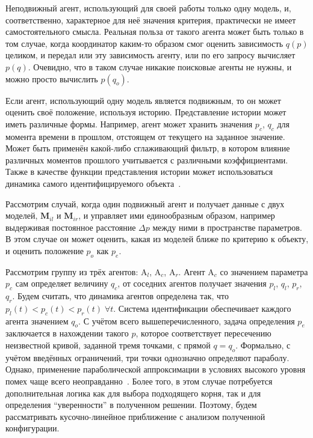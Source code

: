 Неподвижный агент, использующий для своей работы только одну модель,
и, соответственно, характерное для неё значения критерия,
практически не имеет самостоятельного смысла. Реальная польза от такого агента
может быть только в том случае, когда координатор
каким-то образом смог оценить зависимость $q(p)$ целиком,
и передал или эту зависимость агенту, или по его запросу вычисляет $p(q)$.
Очевидно, что в таком случае никакие поисковые агенты не нужны,
и можно просто вычислить $p(q_o)$.

Если агент, использующий одну модель является подвижным,
то он может оценить своё положение, используя историю.
Представление истории может иметь различные формы.
Например, агент может хранить значения $p_c$, $q_c$
для момента времени в прошлом, отстоящем от текущего
на заданное значение. Может быть применён какой-либо
сглаживающий фильтр, в котором влияние различных моментов прошлого учитывается
с различными коэффициентами. Также в качестве функции
представления истории может использоваться
динамика самого идентифицируемого объекта~\cite{mich_92}.

Рассмотрим случай, когда один подвижный агент и получает данные с двух моделей,
$ \mathbf{M}_{il}$ и
$ \mathbf{M}_{ir}$,
и управляет ими единообразным образом, например
выдерживая постоянное расстояние $\Delta p$ между ними в пространстве параметров.
В этом случае он может оценить, какая из моделей ближе по критерию
к объекту, и оценить положение $p_o$ как $p_e$.

Рассмотрим группу из трёх агентов:
$\mathrm{A}_l$,
$\mathrm{A}_c$,
$\mathrm{A}_r$.
Агент $\mathrm{A}_c$ со значением параметра $p_c$
сам определяет величину $q_c$,
от соседних агентов получает значения
$p_l$, $q_l$, $p_r$, $q_r$.
Будем считать, что динамика агентов определена так,
что $p_l(t) < p_c(t) < p_r(t) \; \forall t$.
Система идентификации обеспечивает каждого
агента значением $q_o$. С учётом всего вышеперечисленного,
задача определения $p_e$ заключается в нахождении такого $p$,
которое соответствует пересечению неизвестной кривой,
заданной тремя точками, с прямой $q=q_o$.
Формально, с учётом введённых ограничений,
три точки однозначно определяют параболу.
Однако, применение параболической аппроксимации в условиях
высокого уровня помех чаще всего неоправданно~\cite{atu_asau27}. Более того,
в этом случае потребуется дополнительная логика как для
выбора подходящего корня, так и для определения
``уверенности'' в полученном решении. Поэтому, будем рассматривать
кусочно-линейное приближение с анализом полученной конфигурации.

